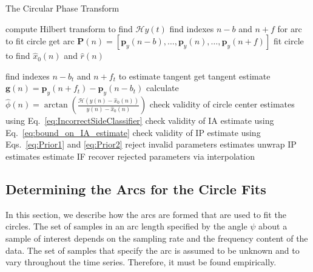 \documentclass[11pt,draftcls,onecolumn]{IEEEtran}
\begin{document}
\begin{algorithm}
\caption{The Circular Phase Transform}\label{CPTAlgorithm}
\begin{algorithmic}[1]
\State compute Hilbert transform to find $\mathcal{H}y(t)$
	\State find indexes $n-b$ and $n+f$ for arc to fit circle
	\State get arc $\mathbf{P}(n) = [\mathbf{p}_y(n-b),\hdots, \mathbf{p}_y(n),\hdots,\mathbf{p}_y(n+f)]$
	\State fit circle to find $\hat{x}_0(n)$ and $\hat{r}(n)$

	\State find indexes $n-b_t$ and $n+f_t$ to estimate tangent 
	\State get tangent estimate $\mathbf{g}(n)= \mathbf{p}_y(n + f_t) - \mathbf{p}_y(n - b_t)$
\EndFor
\State calculate $\hat\phi(n) = \arctan\left(\frac{\mathcal{H}(y(n) - \hat{x}_0(n))}{y(n) - \hat{x}_0(n)}\right)$
\State check validity of circle center estimates using Eq.~\ref{eq:IncorrectSideClassifier}
\State check validity of IA estimate using Eq.~\ref{eq:bound_on_IA_estimate}
\State check validity of IP estimate using Eqs.~\ref{eq:Prior1} and \ref{eq:Prior2}
\State reject invalid parameters estimates
\State unwrap IP estimates
\State estimate IF
\State recover rejected parameters via interpolation
\end{algorithmic}
\end{algorithm}

\subsection{Determining the Arcs for the Circle Fits}\label{sect:FindingArc}
In this section, we describe how the arcs are formed that are used to fit the circles. The set of samples in an arc length specified by the angle $\psi$ about a sample of interest depends on the sampling rate and the frequency content of the data. The set of samples that specify the arc is assumed to be unknown and to vary throughout the time series. Therefore, it must be found empirically.
\end{document}

